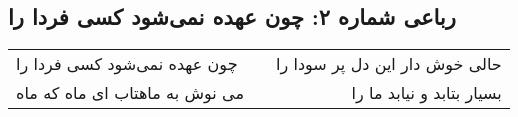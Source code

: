 \begin{center}
\section*{رباعی شماره ۲: چون عهده نمی‌شود کسی فردا را}
\label{sec:sh002}
\begin{longtable}{l p{0.5cm} r}
چون عهده نمی‌شود کسی فردا را
&&
حالی خوش دار این دل پر سودا را
\\
می نوش به ماهتاب ای ماه که ماه
&&
بسیار بتابد و نیابد ما را
\\
\end{longtable}
\end{center}
